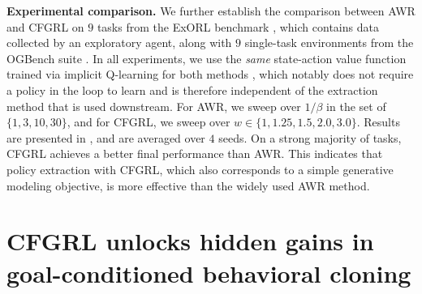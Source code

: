 \documentclass{article}
\begin{document}
\textbf{Experimental comparison.} We further establish the comparison between AWR and CFGRL on $9$ tasks from the ExORL benchmark \citep{exorl_yarats2022}, which contains data collected by an exploratory agent, along with $9$ single-task environments from the OGBench suite \citep{ogbench_park2025}. In all experiments, we use the \textit{same} state-action value function trained via implicit Q-learning for both methods \citep{iql_kostrikov2022}, which notably does not require a policy in the loop to learn and is therefore independent of the extraction method that is used downstream. For AWR, we sweep over $1/\beta$ in the set of $\{1, 3, 10, 30\}$, and for CFGRL, we sweep over $w \in \{1, 1.25, 1.5, 2.0, 3.0\}$. Results are presented in , and are averaged over $4$ seeds. On a strong majority of tasks, CFGRL achieves a better final performance than AWR. This indicates that policy extraction with CFGRL, which also corresponds to a simple generative modeling objective, is more effective than the widely used AWR method.











\section{CFGRL unlocks hidden gains in goal-conditioned behavioral cloning}
\label{section:gcbc}
\end{document}
